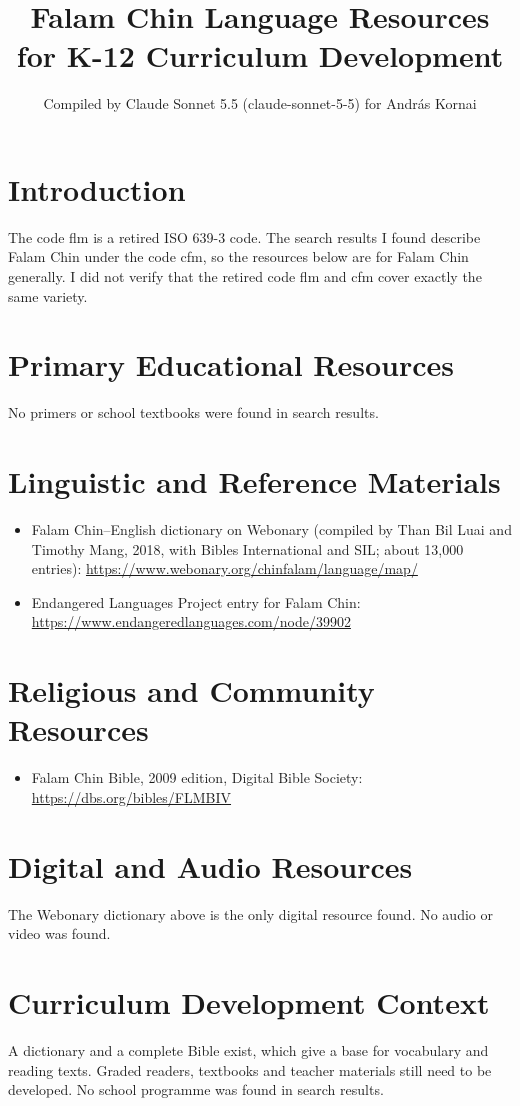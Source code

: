 \documentclass[12pt]{article}
\title{Falam Chin Language Resources for K-12 Curriculum Development}
\author{Compiled by Claude Sonnet 5.5 (claude-sonnet-5-5) for Andr\'as Kornai}
\date{}
\begin{document}
\maketitle

\section{Introduction}
The code flm is a retired ISO 639-3 code. The search results I found describe Falam Chin under the code cfm, so the resources below are for Falam Chin generally. I did not verify that the retired code flm and cfm cover exactly the same variety.

\section{Primary Educational Resources}
No primers or school textbooks were found in search results.

\section{Linguistic and Reference Materials}
\begin{itemize}
\item Falam Chin--English dictionary on Webonary (compiled by Than Bil Luai and Timothy Mang, 2018, with Bibles International and SIL; about 13,000 entries): \url{https://www.webonary.org/chinfalam/language/map/}
\item Endangered Languages Project entry for Falam Chin: \url{https://www.endangeredlanguages.com/node/39902}
\end{itemize}

\section{Religious and Community Resources}
\begin{itemize}
\item Falam Chin Bible, 2009 edition, Digital Bible Society: \url{https://dbs.org/bibles/FLMBIV}
\end{itemize}

\section{Digital and Audio Resources}
The Webonary dictionary above is the only digital resource found. No audio or video was found.

\section{Curriculum Development Context}
A dictionary and a complete Bible exist, which give a base for vocabulary and reading texts. Graded readers, textbooks and teacher materials still need to be developed. No school programme was found in search results.
\end{document}
